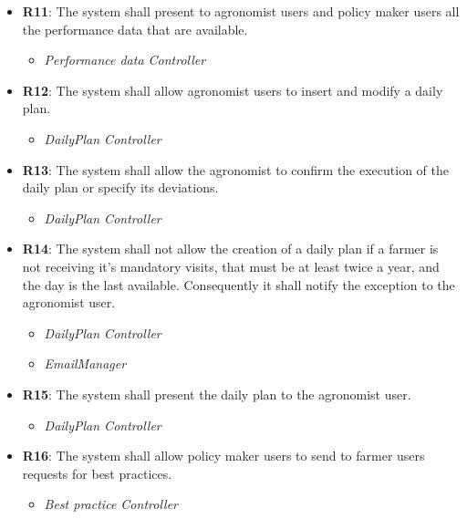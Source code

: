 \documentclass{article}
\begin{document}
\begin{itemize}
        \item \textbf{R11}: The system shall present to agronomist users and policy maker users all the performance data that are available.
            \begin{itemize}
                \item \textit{Performance data Controller}
            \end{itemize}
        
        \item \textbf{R12}: The system shall allow agronomist users to insert and modify a daily plan.
            \begin{itemize}
                \item \textit{DailyPlan Controller}
            \end{itemize}
        
        \item \textbf{R13}: The system shall allow the agronomist to confirm the execution of the daily plan or specify its deviations.
            \begin{itemize}
                \item \textit{DailyPlan Controller}
            \end{itemize}
        
        \item \textbf{R14}: The system shall not allow the creation of a daily plan if a farmer is not receiving it’s mandatory visits, that must be at least twice a year, and the day is the last available. Consequently it shall notify the exception to the agronomist user.
            \begin{itemize}
                \item \textit{DailyPlan Controller}
                \item \textit{EmailManager}
            \end{itemize}
            
        \item \textbf{R15}: The system shall present the daily plan to the agronomist user.
            \begin{itemize}
                \item \textit{DailyPlan Controller}
            \end{itemize}
        
        \item \textbf{R16}: The system shall allow policy maker users to send to farmer users requests for best practices.
            \begin{itemize}
                \item \textit{Best practice Controller}
            \end{itemize}
        

\end{itemize}
\end{document}
